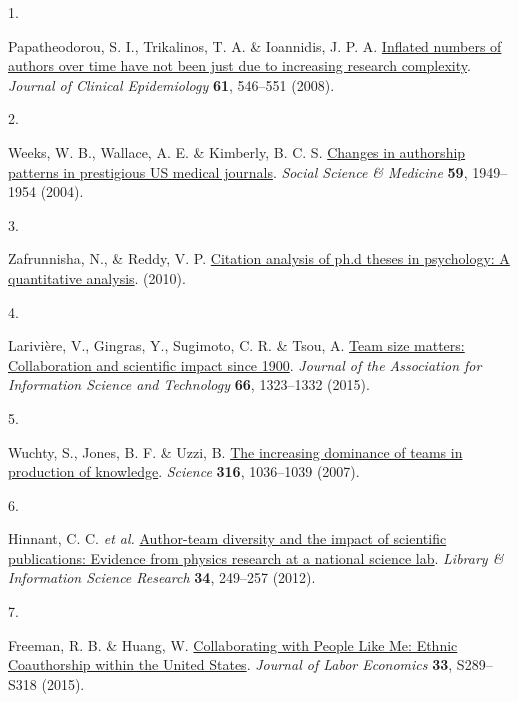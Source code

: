 \documentclass[
  man,floatsintext]{apa6}
\newlength{\cslhangindent}
\newlength{\csllabelwidth}
\newlength{\cslentryspacingunit} %
\newenvironment{CSLReferences}[2] %
 {%
  \setlength{\parindent}{0pt}
  \ifodd #1
  \let\oldpar\par
  \def\par{\hangindent=\cslhangindent\oldpar}
  \fi
  \setlength{\parskip}{#2\cslentryspacingunit}
 }%
 {}
\newcommand{\CSLLeftMargin}[1]{\parbox[t]{\csllabelwidth}{#1}}
\newcommand{\CSLRightInline}[1]{\parbox[t]{\linewidth - \csllabelwidth}{#1}\break}
\begin{document}
\hypertarget{refs}{}
\begin{CSLReferences}{0}{0}
\leavevmode{}%
\CSLLeftMargin{1. }%
\CSLRightInline{Papatheodorou, S. I., Trikalinos, T. A. \& Ioannidis, J. P. A. \href{https://doi.org/10.1016/j.jclinepi.2007.07.017}{Inflated numbers of authors over time have not been just due to increasing research complexity}. \emph{Journal of Clinical Epidemiology} \textbf{61}, 546--551 (2008).}

\leavevmode{}%
\CSLLeftMargin{2. }%
\CSLRightInline{Weeks, W. B., Wallace, A. E. \& Kimberly, B. C. S. \href{https://doi.org/10.1016/j.socscimed.2004.02.029}{Changes in authorship patterns in prestigious US medical journals}. \emph{Social Science \& Medicine} \textbf{59}, 1949--1954 (2004).}

\leavevmode{}%
\CSLLeftMargin{3. }%
\CSLRightInline{Zafrunnisha, N., \& Reddy, V. P. \href{https://www.indianjournals.com/ijor.aspx?target=ijor:pjolis\&volume=5\&issue=1\&article=010}{Citation analysis of ph.d theses in psychology: A quantitative analysis}. (2010).}

\leavevmode{}%
\CSLLeftMargin{4. }%
\CSLRightInline{Larivière, V., Gingras, Y., Sugimoto, C. R. \& Tsou, A. \href{https://doi.org/10.1002/asi.23266}{Team size matters: Collaboration and scientific impact since 1900}. \emph{Journal of the Association for Information Science and Technology} \textbf{66}, 1323--1332 (2015).}

\leavevmode{}%
\CSLLeftMargin{5. }%
\CSLRightInline{Wuchty, S., Jones, B. F. \& Uzzi, B. \href{https://doi.org/10.1126/science.1136099}{The increasing dominance of teams in production of knowledge}. \emph{Science} \textbf{316}, 1036--1039 (2007).}

\leavevmode{}%
\CSLLeftMargin{6. }%
\CSLRightInline{Hinnant, C. C. \emph{et al.} \href{https://doi.org/10.1016/j.lisr.2012.03.001}{Author-team diversity and the impact of scientific publications: Evidence from physics research at a national science lab}. \emph{Library \& Information Science Research} \textbf{34}, 249--257 (2012).}

\leavevmode{}%
\CSLLeftMargin{7. }%
\CSLRightInline{Freeman, R. B. \& Huang, W. \href{https://doi.org/10.1086/678973}{Collaborating with People Like Me: Ethnic Coauthorship within the United States}. \emph{Journal of Labor Economics} \textbf{33}, S289--S318 (2015).}


\end{CSLReferences}
\end{document}
